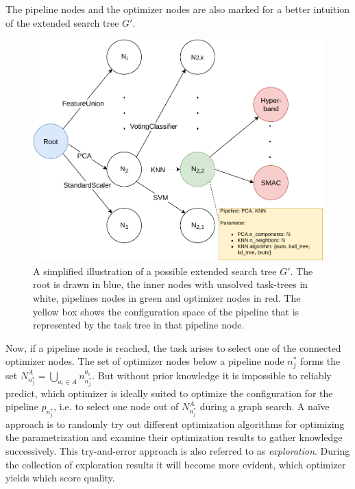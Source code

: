 The pipeline nodes and the optimizer nodes are also marked for a better intuition of the extended search tree $G'$.
\begin{figure}[ht!]
    \centering
    \includegraphics[width=\textwidth]{gfx/Figures/Approach/SearchGraph.pdf}
    \caption[A simplified illustration of a possible extended search tree $G'$.]{A simplified illustration of a possible extended search tree $G'$. The root is drawn in blue, the inner nodes with unsolved task-trees in white, pipelines nodes in green and optimizer nodes in red.
    The yellow box shows the configuration space of the pipeline that is represented by the task tree in that pipeline node.}
    \label{fig:approach:search-graph}
\end{figure}

Now, if a pipeline node is reached, the task arises to select one of the connected optimizer nodes.
The set of optimizer nodes below a pipeline node $n^*_j$ forms the set $N^A_{n^*_j} = \bigcup_{a_i \in A} n^{a_i}_{n^*_j}$.
But without prior knowledge it is impossible to reliably predict, which optimizer is ideally suited to optimize the configuration for the pipeline $p_{n^*_j}$, i.e. to select one node out of $N^A_{n^*_j}$ during a graph search.\newline
A na\"ive approach is to randomly try out different optimization algorithms for optimizing the parametrization and examine their optimization results to gather knowledge successively.
This try-and-error approach is also referred to as \textit{exploration}.
During the collection of exploration results it will become more evident, which optimizer yields which score quality.


